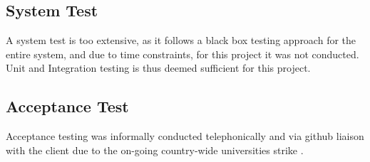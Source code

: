 \subsection{System Test}

A system test is too extensive, as it follows a black box testing approach for the entire system, and due to time constraints, for this project it was not conducted. Unit and Integration testing is thus deemed sufficient for this project. \\

\subsection{Acceptance Test}

Acceptance testing was informally conducted telephonically and via github liaison with the client due to the on-going country-wide universities strike .